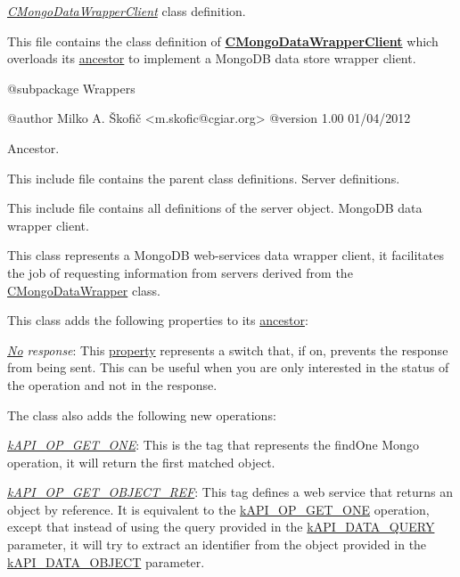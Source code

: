 {\itshape \hyperlink{class_c_mongo_data_wrapper_client}{C\-Mongo\-Data\-Wrapper\-Client}} class definition.

This file contains the class definition of {\bfseries \hyperlink{class_c_mongo_data_wrapper_client}{C\-Mongo\-Data\-Wrapper\-Client}} which overloads its \hyperlink{class_c_data_wrapper_client}{ancestor} to implement a Mongo\-D\-B data store wrapper client.

\begin{DoxyVerb} @subpackage        Wrappers

 @author            Milko A. Škofič <m.skofic@cgiar.org>
 @version   1.00 01/04/2012\end{DoxyVerb}


Ancestor.

This include file contains the parent class definitions. Server definitions.

This include file contains all definitions of the server object. Mongo\-D\-B data wrapper client.

This class represents a Mongo\-D\-B web-\/services data wrapper client, it facilitates the job of requesting information from servers derived from the \hyperlink{class_c_mongo_data_wrapper}{C\-Mongo\-Data\-Wrapper} class.

This class adds the following properties to its \hyperlink{class_c_wrapper_client}{ancestor}\-:


\begin{DoxyItemize}
\item {\itshape \hyperlink{}{No} response}\-: This \hyperlink{}{property} represents a switch that, if on, prevents the response from being sent. This can be useful when you are only interested in the status of the operation and not in the response. 
\end{DoxyItemize}

The class also adds the following new operations\-:


\begin{DoxyItemize}
\item {\itshape \hyperlink{}{k\-A\-P\-I\-\_\-\-O\-P\-\_\-\-G\-E\-T\-\_\-\-O\-N\-E}}\-: This is the tag that represents the find\-One Mongo operation, it will return the first matched object. 
\item {\itshape \hyperlink{}{k\-A\-P\-I\-\_\-\-O\-P\-\_\-\-G\-E\-T\-\_\-\-O\-B\-J\-E\-C\-T\-\_\-\-R\-E\-F}}\-: This tag defines a web service that returns an object by reference. It is equivalent to the \hyperlink{}{k\-A\-P\-I\-\_\-\-O\-P\-\_\-\-G\-E\-T\-\_\-\-O\-N\-E} operation, except that instead of using the query provided in the \hyperlink{}{k\-A\-P\-I\-\_\-\-D\-A\-T\-A\-\_\-\-Q\-U\-E\-R\-Y} parameter, it will try to extract an identifier from the object provided in the \hyperlink{}{k\-A\-P\-I\-\_\-\-D\-A\-T\-A\-\_\-\-O\-B\-J\-E\-C\-T} parameter. 
\end{DoxyItemize}


